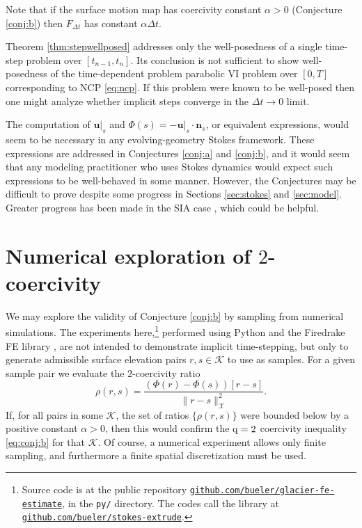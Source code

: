 \documentclass[hidelinks,onefignum,onetabnum,final]{siamart220329}  %
\newcommand{\bn}{\mathbf{n}}
\newcommand{\bu}{\mathbf{u}}
\newcommand{\cK}{\mathcal{K}}
\newcommand{\cX}{\mathcal{X}}
\newcommand{\qq}{{\text{\textnormal{q}}}}
\begin{document}
Note that if the surface motion map has coercivity constant $\alpha>0$ (Conjecture \ref{conj:b}) then $F_{\Delta t}$ has constant $\alpha\Delta t$.

Theorem \ref{thm:stepwellposed} addresses only the well-posedness of a single time-step problem over $[t_{n-1},t_n]$.  Its conclusion is not sufficient to show well-posedness of the time-dependent problem parabolic VI problem over $[0,T]$ corresponding to NCP \eqref{eq:ncp}.  If this problem were known to be well-posed then one might analyze whether implicit steps converge in the $\Delta t\to 0$ limit.

The computation of $\bu|_s$ and $\Phi(s)=-\bu|_s\cdot \bn_s$, or equivalent expressions, would seem to be necessary in any evolving-geometry Stokes framework.  These expressions are addressed in Conjectures \ref{conj:a} and \ref{conj:b}, and it would seem that any modeling practitioner who uses Stokes dynamics would expect such expressions to be well-behaved in some manner.  However, the Conjectures may be difficult to prove despite some progress in Sections \ref{sec:stokes} and \ref{sec:model}.  Greater progress has been made in the SIA case \cite{Calvoetal2003,JouvetBueler2012,PiersantiTemam2023}, which could be helpful.


\section{Numerical exploration of $2$-coercivity} \label{sec:numerical}

We may explore the validity of Conjecture \ref{conj:b} by sampling from numerical simulations.  The experiments here,\footnote{Source code is at the public repository \href{https://github.com/bueler/glacier-fe-estimate}{\texttt{github.com/bueler/glacier-fe-estimate}}, in the \texttt{py/} directory.  The codes call the library at \href{https://github.com/bueler/stokes-extrude}{\texttt{github.com/bueler/stokes-extrude}}.} performed using Python and the Firedrake FE library \cite{Hametal2023}, are not intended to demonstrate implicit time-stepping, but only to generate admissible surface elevation pairs $r,s\in\cK$ to use as samples.  For a given sample pair we evaluate the $2$-coercivity ratio
\begin{equation}
\rho(r,s) = \frac{\left(\Phi(r) - \Phi(s)\right)[r-s]}{\|r-s\|_{\cX}^2}. \label{eq:Phiratio}
\end{equation}
If, for all pairs in some $\cK$, the set of ratios $\{\rho(r,s)\}$ were bounded below by a positive constant $\alpha>0$, then this would confirm the $\qq=2$ coercivity inequality \eqref{eq:conj:b} for that $\cK$.  Of course, a numerical experiment allows only finite sampling, and furthermore a finite spatial discretization must be used.
\end{document}

